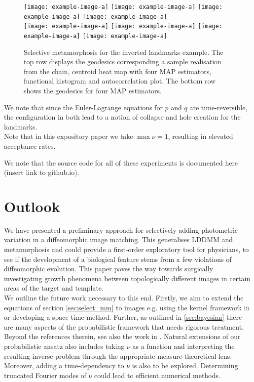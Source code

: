 \documentclass[runningheads]{llncs}
\begin{document}
\begin{figure}
\centering
\begin{minipage}{\textwidth}
  \centering
    \texttt{[image: example-image-a]}\quad
    \texttt{[image: example-image-a]}\quad
    \texttt{[image: example-image-a]}\quad
    \texttt{[image: example-image-a]}\\[0.25cm]
    \texttt{[image: example-image-a]}\quad
    \texttt{[image: example-image-a]}\quad
    \texttt{[image: example-image-a]}\quad
    \texttt{[image: example-image-a]}
    \caption{Selective metamorphosis for the inverted landmarks example. The top
    row displays the geodesics corresponding a sample realisation from the
    chain, centroid heat map with four MAP estimators, functional histogram and
    autocorrelation plot. The bottom row shows the geodesics for four MAP
    estimators.}
    \label{fig:selective:triangle}
\end{minipage}
\end{figure}

We note that since the Euler-Lagrange equations for $p$ and $q$ are
time-reversible, the configuration in both lead to a notion of
collapse and hole creation for the landmarks.\\

Note that in this expository paper we take $\max \nu = 1$, resulting in
elevated acceptance rates.

We note that the source code for all of these experiments is documented
here (insert link to github.io).

\section{Outlook}\label{sec:outlook}

We have presented a preliminary approach for selectively adding photometric
variation in a diffeomorphic image matching. This generalises LDDMM and
metamorphosis and  could provide a first-order exploratory tool for physicians,
to see if the development of a biological feature stems from a few violations of
diffeomorphic evolution. This paper paves the way towards surgically
investigating growth phenomena between topologically different images in certain
areas of the target and template.\\

We outline the future work necessary to this end. Firstly, we aim to extend the
equations of section \ref{sec:select_mm} to images e.g. using the kernel
framework in \cite{richardson2016metamorphosis} or developing a space-time
method. Further, as outlined in \ref{sec:bayesian} there are many aspects of the
probabilistic framework that needs rigorous treatment. Beyond the references
therein, see also the work in \cite{dashti2013map}. Natural extensions of our
probabilistic ansatz also includes taking $\nu$ as a function and interpreting
the resulting inverse problem through the appropriate measure-theoretical lens.
Moreover, adding a time-dependency to $\nu$ is also to be explored. Determining
truncated Fourier modes of $\nu$ could lead to efficient numerical methods.\\
\end{document}
